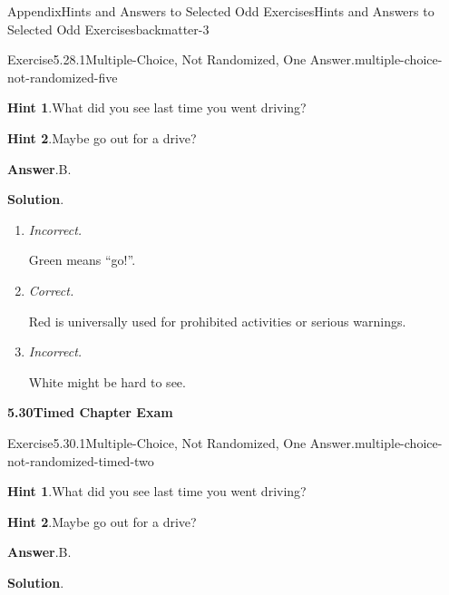 \documentclass[oneside,10pt,]{book}
\newcommand{\blocktitlefont}{\relax}
\newcommand{\lititle}[1]{{\slshape#1}}
\numberwithin{equation}{section}
\begin{document}
\begin{solutions-chapter}{Appendix}{Hints and Answers to Selected Odd Exercises}{}{Hints and Answers to Selected Odd Exercises}{}{}{backmatter-3}
\begin{divisionsolution}{Exercise}{5.28.1}{Multiple-Choice, Not Randomized, One Answer.}{multiple-choice-not-randomized-five}%
\par\smallskip%
\noindent\textbf{\blocktitlefont Hint 1}.\hypertarget{multiple-choice-not-randomized-five-4-back}{}\quad{}What did you see last time you went driving?%
\par\smallskip%
\noindent\textbf{\blocktitlefont Hint 2}.\hypertarget{multiple-choice-not-randomized-five-5-back}{}\quad{}Maybe go out for a drive?%
\par\smallskip%
\noindent\textbf{\blocktitlefont Answer}.\hypertarget{multiple-choice-not-randomized-five-6-back}{}\quad{}B.%
\par\smallskip%
\noindent\textbf{\blocktitlefont Solution}.\hypertarget{multiple-choice-not-randomized-five-7-back}{}\quad{}%
\begin{enumerate}[label={\Alph*.}]
\item{}\lititle{Incorrect.}\par%
Green means ``go!''.%
\item{}\lititle{Correct.}\par%
Red is universally used for prohibited activities or serious warnings.%
\item{}\lititle{Incorrect.}\par%
White might be hard to see.%
\end{enumerate}
%
\end{divisionsolution}%
\par\medskip
\noindent\textbf{\Large{}5.30\space\textperiodcentered\space{}Timed Chapter Exam}
\begin{divisionsolution}{Exercise}{5.30.1}{Multiple-Choice, Not Randomized, One Answer.}{multiple-choice-not-randomized-timed-two}%
\par\smallskip%
\noindent\textbf{\blocktitlefont Hint 1}.\hypertarget{multiple-choice-not-randomized-timed-two-4-back}{}\quad{}What did you see last time you went driving?%
\par\smallskip%
\noindent\textbf{\blocktitlefont Hint 2}.\hypertarget{multiple-choice-not-randomized-timed-two-5-back}{}\quad{}Maybe go out for a drive?%
\par\smallskip%
\noindent\textbf{\blocktitlefont Answer}.\hypertarget{multiple-choice-not-randomized-timed-two-6-back}{}\quad{}B.%
\par\smallskip%
\noindent\textbf{\blocktitlefont Solution}.\hypertarget{multiple-choice-not-randomized-timed-two-7-back}{}\quad{}%

\end{divisionsolution}
\end{solutions-chapter}
\end{document}
